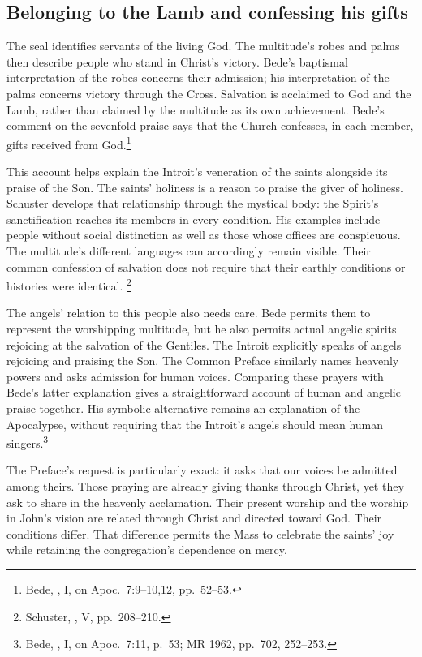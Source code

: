 \subsection{Belonging to the Lamb and confessing his gifts}
The seal identifies servants of the living God. The multitude's robes and
palms then describe people who stand in Christ's victory. Bede's baptismal
interpretation of the robes concerns their admission; his interpretation of
the palms concerns victory through the Cross. Salvation is acclaimed to
God and the Lamb, rather than claimed by the multitude as its own
achievement. Bede's comment on the sevenfold praise says that the Church
confesses, in each member, gifts received from God.\footnote{Bede,
, I, on Apoc.~7:9--10,12, pp.~52--53.}

This account helps explain the Introit's veneration of the saints alongside
its praise of the Son. The saints' holiness is a reason to praise the giver
of holiness. Schuster develops that relationship through the mystical body:
the Spirit's sanctification reaches its members in every condition.
His examples include people without social distinction as well as those
whose offices are conspicuous. The multitude's different languages can
accordingly remain visible. Their common confession of salvation does not
require that their earthly conditions or histories were identical.
\footnote{Schuster, , V, pp.~208--210.}

The angels' relation to this people also needs care. Bede permits them to
represent the worshipping multitude, but he also permits actual angelic
spirits rejoicing at the salvation of the Gentiles. The Introit explicitly
speaks of angels rejoicing and praising the Son. The Common Preface similarly
names heavenly powers and asks admission for human voices. Comparing these
prayers with Bede's latter explanation gives a straightforward account of
human and angelic praise together. His symbolic alternative remains an
explanation of the Apocalypse, without requiring that the Introit's
angels should mean human singers.\footnote{Bede, , I,
on Apoc.~7:11, p.~53; MR 1962, pp.~702, 252--253.}

The Preface's request is particularly exact: it asks that our voices be
admitted among theirs. Those praying are already giving thanks through
Christ, yet they ask to share in the heavenly acclamation. Their present
worship and the worship in John's vision are related through Christ and
directed toward God. Their conditions differ. That difference permits the
Mass to celebrate the saints' joy while retaining the congregation's
dependence on mercy.

